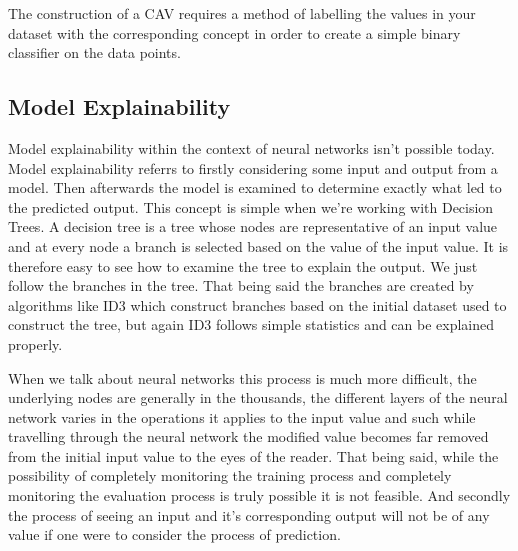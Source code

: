 The construction of a CAV requires a method of labelling the values in your dataset with
the corresponding concept in order to create a simple binary classifier on the data points.

\subsection{Model Explainability}

Model explainability within the context of neural networks isn't possible today. Model
explainability referrs to firstly considering some input and output from a model. Then
afterwards the model is examined to determine exactly what led to the predicted output.
This concept is simple when we're working with Decision Trees. A decision tree is a tree
whose nodes are representative of an input value and at every node a branch is selected
based on the value of the input value. It is therefore easy to see how to examine the tree
to explain the output. We just follow the branches in the tree. That being said the branches
are created by algorithms like ID3 which construct branches based on the initial dataset used
to construct the tree, but again ID3 follows simple statistics and can be explained properly.


When we talk about neural networks this process is much more difficult, the underlying nodes
are generally in the thousands, the different layers of the neural network varies in the operations
it applies to the input value and such while travelling through the neural network the modified
value becomes far removed from the initial input value to the eyes of the reader. That being said,
while the possibility of completely monitoring the training process and completely monitoring the
evaluation process is truly possible it is not feasible. And secondly the process of seeing an
input and it's corresponding output will not be of any value if one were to consider the process
of prediction.

